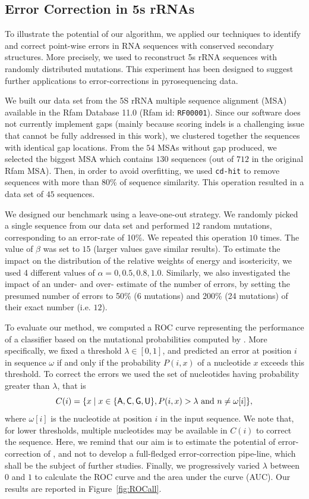 \subsection{Error Correction in 5s rRNAs}

To illustrate the potential of our algorithm, we applied our techniques to identify and correct point-wise errors in RNA sequences
with conserved secondary structures. More precisely, we used \RNApyro to reconstruct 5s rRNA sequences with randomly distributed
mutations. This experiment has been designed to suggest further applications to error-corrections in pyrosequencing data.

We built our data set from the 5S rRNA multiple sequence alignment (MSA) available in the Rfam Database 11.0 (Rfam id: \texttt{RF00001}).
Since our software does not currently implement gaps (mainly because scoring indels is a challenging issue that cannot be fully addressed
in this work),  we clustered together the sequences with identical gap locations. From the $54$ MSAs without gap produced, we selected the
biggest MSA  which contains $130$ sequences (out of $712$ in the original Rfam MSA). Then, in order to avoid overfitting, we used \texttt{cd-hit}
\cite{Li:2006fk} to remove sequences with more than 80\% of sequence similarity. This operation resulted in a data set of $45$ sequences. 

We designed our benchmark using a leave-one-out strategy. We randomly picked a single sequence from our data set and performed $12$ random
mutations, corresponding to an error-rate of 10\%. We repeated this operation $10$ times. The value of $\beta$ was set to $15$ (larger values gave similar results). 
To estimate the impact on the distribution of the relative weights of energy and isostericity, we used 4 different values of $\alpha = {0, 0.5, 0.8, 1.0}$. 
Similarly, we also investigated the impact of an under- and over- estimate of the number of errors, by setting the presumed number of errors to 50\% (6 mutations) and 200\% (24 mutations) of their exact number (i.e. $12$).

To evaluate our method, we computed a ROC curve representing the performance of a classifier based on the mutational probabilities computed
by \RNApyro. More specifically, we fixed a threshold $\lambda \in [0,1]$, and predicted an error at position $i$ in sequence $\omega$ if and only if the
probability $P(i,x)$ of a nucleotide $x$ exceeds this threshold. To correct the errors we used the set of nucleotides having probability
greater than $\lambda$, that is  
$$C(i) = \{ x \; | \;  x \in \{ {\sf{A}},{\sf{C}},{\sf{G}},{\sf{U}} \}, P(i,x) > \lambda \mbox{ and }  n \neq \omega[i] \},$$
 where $\omega[i]$ is
the nucleotide at position $i$ in the input sequence. We note that, for lower thresholds, multiple nucleotides may be available in $C(i)$ to correct
the sequence. Here, we remind that our aim is to estimate the potential of error-correction of \RNApyro, and not to develop a full-fledged error-correction pipe-line, which  
shall be the subject of further studies. Finally, we progressively varied $\lambda$ between $0$ and $1$ to calculate the ROC curve and the area
under the curve (AUC). Our results are reported in Figure~\ref{fig:ROCall}. 

